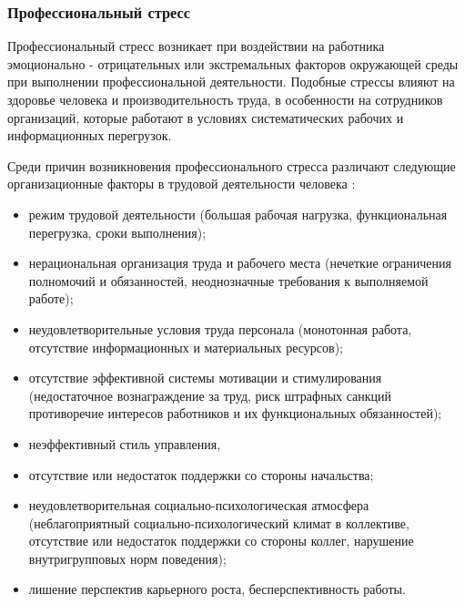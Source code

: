 \subsubsection{Профессиональный стресс}
Профессиональный стресс возникает при воздействии на работника эмоционально - отрицательных или экстремальных факторов окружающей среды при выполнении профессиональной деятельности. Подобные стрессы влияют на здоровье человека и производительность труда, в особенности на сотрудников организаций, которые работают в условиях систематических рабочих и информационных перегрузок. \cite{professionalStress}

Среди причин возникновения профессионального стресса различают следующие организационные факторы в трудовой деятельности человека \cite{professionalStress}:
\begin{itemize}[leftmargin=1.6\parindent]
\item режим трудовой деятельности (большая рабочая нагрузка, функциональная перегрузка, сроки выполнения);
\item нерациональная организация труда и рабочего места (нечеткие ограничения полномочий и обязанностей, неоднозначные требования к выполняемой работе);
\item неудовлетворительные условия труда персонала (монотонная работа, отсутствие информационных и материальных ресурсов);
\item отсутствие эффективной системы мотивации и стимулирования (недостаточное вознаграждение за труд, риск штрафных санкций противоречие интересов работников и их функциональных обязанностей);
\item неэффективный стиль управления, 
\item отсутствие или недостаток поддержки со стороны начальства;
\item неудовлетворительная социально-психологическая атмосфера (неблагоприятный социально-психологический климат в коллективе, отсутствие или недостаток поддержки со стороны коллег, нарушение внутригрупповых норм поведения);
\item лишение перспектив карьерного роста, бесперспективность работы.
\end{itemize}


